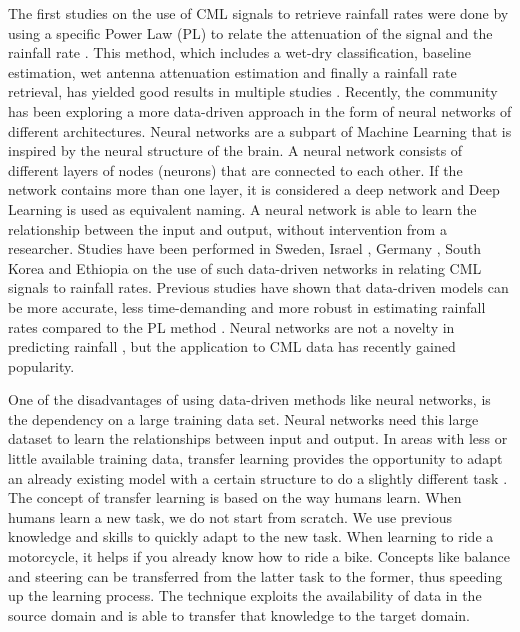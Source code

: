 \documentclass[twocolumn, 10pt, a4paper]{memoir}
\begin{document}
The first studies on the use of CML signals to retrieve rainfall rates were done by using a specific Power Law (PL) to relate the attenuation of the signal and the rainfall rate . This method, which includes a wet-dry classification, baseline estimation, wet antenna attenuation estimation and finally a rainfall rate retrieval, has yielded good results in multiple studies . Recently, the community has been exploring a more data-driven approach in the form of neural networks of different architectures. Neural networks are a subpart of Machine Learning that is inspired by the neural structure of the brain. A neural network consists of different layers of nodes (neurons) that are connected to each other. If the network contains more than one layer, it is considered a deep network and Deep Learning is used as equivalent naming. A neural network is able to learn the relationship between the input and output, without intervention from a researcher. Studies have been performed in Sweden, Israel , Germany , South Korea and Ethiopia \cite{Diba2021} on the use of such data-driven networks in relating CML signals to rainfall rates. Previous studies have shown that data-driven models can be more accurate, less time-demanding and more robust in estimating rainfall rates compared to the PL method . Neural networks are not a novelty in predicting rainfall , but the application to CML data has recently gained popularity.

One of the disadvantages of using data-driven methods like neural networks, is the dependency on a large training data set. Neural networks need this large dataset to learn the relationships between input and output. In areas with less or little available training data, transfer learning provides the opportunity to adapt an already existing model with a certain structure to do a slightly different task \cite{TanYear}. The concept of transfer learning is based on the way humans learn. When humans learn a new task, we do not start from scratch. We use previous knowledge and skills to quickly adapt to the new task. When learning to ride a motorcycle, it helps if you already know how to ride a bike. Concepts like balance and steering can be transferred from the latter task to the former, thus speeding up the learning process. 
The technique exploits the availability of data in the source domain and is able to transfer that knowledge to the target domain.
\end{document}
